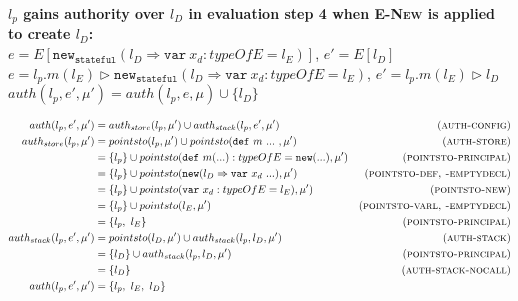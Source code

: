 \documentclass{llncs}
\newcommand{\keywadj}[1]{\mathtt{#1}}
\newcommand{\keyw}[1]{\keywadj{#1}~}
\begin{document}
\newpage

\noindent\textbf{$l_p$ gains authority over $l_D$ in evaluation step 4 when \textsc{E-New} is applied to create $l_D$:}\\

\noindent$e = E[\keywadj{new}_{\keywadj{stateful}}(l_D \Rightarrow \keyw{var} x_d : typeOfE = l_E)]$, $e' = E[l_D]$\\

\noindent$e = l_p.m(l_E) \rhd \keywadj{new}_{\keywadj{stateful}}(l_D \Rightarrow \keyw{var} x_d : typeOfE = l_E)$, $e' = l_p.m(l_E) \rhd l_D$\\

\noindent$auth(l_p, e', \mu') = auth(l_p, e, \mu) \cup \{ l_D \}$

\begin{align*}
auth(l_p, e', \mu') &= auth_{store}(l_p, \mu') \cup auth_{stack}(l_p, e', \mu') & (\textsc{auth-config})\\
auth_{store}(l_p, \mu') &= pointsto(l_p, \mu') \cup pointsto(\keyw{def} m~...~, \mu') & (\textsc{auth-store})\\
 &= \{ l_p \} \cup pointsto(\keyw{def} m(...) : typeOfE = \keywadj{new}(...), \mu') & (\textsc{pointsto-principal})\\
 &= \{ l_p \} \cup pointsto(\keywadj{new}(l_D \Rightarrow \keyw{var} x_d~...), \mu') & (\textsc{pointsto-def, -emptydecl})\\
 &= \{ l_p \} \cup pointsto(\keyw{var} x_d : typeOfE = l_E), \mu') & (\textsc{pointsto-new})\\
 &= \{ l_p \} \cup pointsto(l_E, \mu') & (\textsc{pointsto-varl, -emptydecl})\\ 
 &= \{ l_p,~l_E \} & (\textsc{pointsto-principal})\\
auth_{stack}(l_p, e', \mu') &= pointsto(l_D, \mu') \cup auth_{stack}(l_p, l_D, \mu') & (\textsc{auth-stack})\\
 &= \{ l_D \} \cup auth_{stack}(l_p, l_D, \mu') & (\textsc{pointsto-principal})\\
 &= \{ l_D \} & (\textsc{auth-stack-nocall})\\
auth(l_p, e', \mu') &= \{ l_p,~l_E,~l_D \} &\\
\end{align*}
\end{document}
